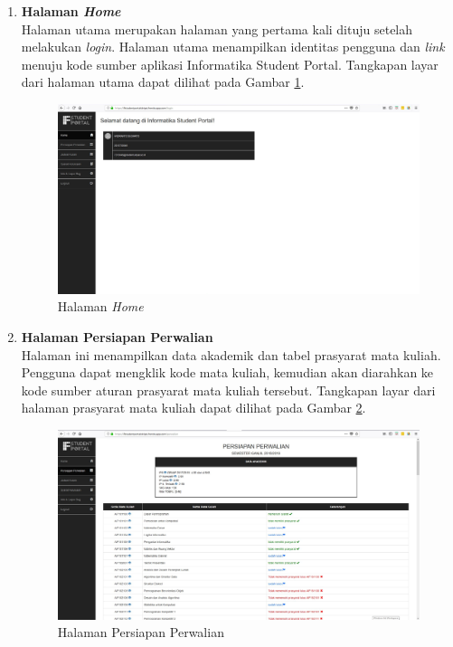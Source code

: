 \begin{enumerate}
				\item\textbf{Halaman \textit{Home}}\\
				Halaman utama merupakan halaman yang pertama kali dituju setelah melakukan \textit{login}. Halaman utama menampilkan identitas pengguna dan \textit{link} menuju kode sumber aplikasi Informatika Student Portal. Tangkapan layar dari halaman utama dapat dilihat pada Gambar \ref{fig:5_halaman_utama}.
					\begin{figure}[H]
						\centering
						\includegraphics[scale=0.34]{Gambar/halaman_home}
						\caption{Halaman \textit{Home}} 
						\label{fig:5_halaman_utama}
					\end{figure}
						
				\item\textbf{Halaman Persiapan Perwalian}\\
				Halaman ini menampilkan data akademik dan tabel prasyarat mata kuliah. Pengguna dapat mengklik kode mata kuliah, kemudian akan diarahkan ke kode sumber aturan prasyarat mata kuliah tersebut. Tangkapan layar dari halaman prasyarat mata kuliah dapat dilihat pada Gambar \ref{fig:5_halaman_persiapan_perwalian}.
					\begin{figure}[H]
						\centering
						\includegraphics[scale=0.34]{Gambar/halaman_persiapan_perwalian}
						\caption{Halaman Persiapan Perwalian} 
						\label{fig:5_halaman_persiapan_perwalian}
					\end{figure}


\end{enumerate}
